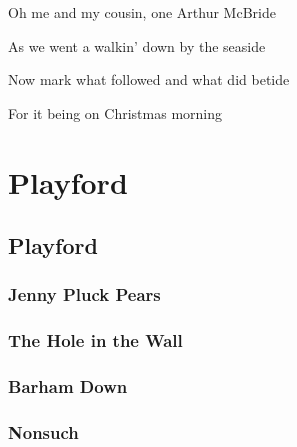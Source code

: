\documentclass[letterpaper,10pt,english]{sphinxmanual}
\begin{document}
\begin{DUlineblock}{0em}
\item[] Oh me and my cousin, one Arthur McBride
\item[] As we went a walkin’ down by the seaside
\item[] Now mark what followed and what did betide
\item[] For it being on Christmas morning
\end{DUlineblock}


\chapter{Playford}
\label{\detokenize{Playford/index:playford}}\label{\detokenize{Playford/index::doc}}

\section{Playford}
\label{\detokenize{Playford/Playford:playford}}\label{\detokenize{Playford/Playford::doc}}

\subsection{Jenny Pluck Pears}
\label{\detokenize{Playford/Playford:jenny-pluck-pears}}
\noindent{}


\subsection{The Hole in the Wall}
\label{\detokenize{Playford/Playford:the-hole-in-the-wall}}
\noindent{}


\subsection{Barham Down}
\label{\detokenize{Playford/Playford:barham-down}}
\noindent{}


\subsection{Nonsuch}
\label{\detokenize{Playford/Playford:nonsuch}}
\noindent{}



\renewcommand{\indexname}{Index}
\printindex
\end{document}
